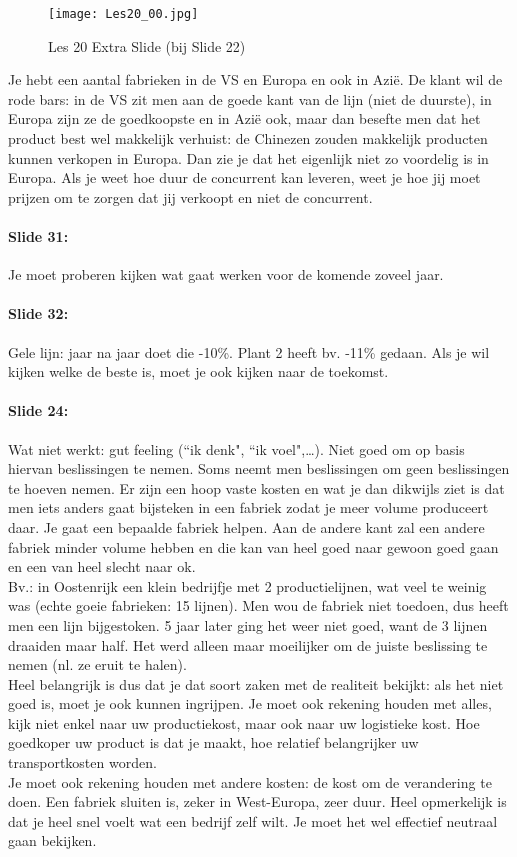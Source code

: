 \documentclass[10pt,a4paper]{report}
\begin{document}
\begin{figure}[h!]
\centering
\texttt{[image: Les20\_00.jpg]}
\caption{Les 20 Extra Slide (bij Slide 22)} 
\label{les20_00}
\end{figure}

Je hebt een aantal fabrieken in de VS en Europa en ook in Azi\"e. De klant wil de rode bars: in de VS zit men aan de goede kant van de lijn (niet de duurste), in Europa zijn ze de goedkoopste en in Azi\"e ook, maar dan besefte men dat het product best wel makkelijk verhuist: de Chinezen zouden makkelijk producten kunnen verkopen in Europa. Dan zie je dat het eigenlijk niet zo voordelig is in Europa. Als je weet hoe duur de concurrent kan leveren, weet je hoe jij moet prijzen om te zorgen dat jij verkoopt en niet de concurrent.

\paragraph{Slide 31:} Je moet proberen kijken wat gaat werken voor de komende zoveel jaar. 

\paragraph{Slide 32:} Gele lijn: jaar na jaar doet die -10\%. Plant 2 heeft bv. -11\% gedaan. Als je wil kijken welke de beste is, moet je ook kijken naar de toekomst.

\paragraph{Slide 24:} Wat niet werkt: gut feeling (``ik denk", ``ik voel",…). Niet goed om op basis hiervan beslissingen te nemen. Soms neemt men beslissingen om geen beslissingen te hoeven nemen. Er zijn een hoop vaste kosten en wat je dan dikwijls ziet is dat men iets anders gaat bijsteken in een fabriek zodat je meer volume produceert daar. Je gaat een bepaalde fabriek helpen. Aan de andere kant zal een andere fabriek minder volume hebben en die kan van heel goed naar gewoon goed gaan en een van heel slecht naar ok. \\
Bv.: in Oostenrijk een klein bedrijfje met 2 productielijnen, wat veel te weinig was (echte goeie fabrieken: 15 lijnen). Men wou de fabriek niet toedoen, dus heeft men een lijn bijgestoken. 5 jaar later ging het weer niet goed, want de 3 lijnen draaiden maar half. Het werd alleen maar moeilijker om de juiste beslissing te nemen (nl. ze eruit te halen). \\
Heel belangrijk is dus dat je dat soort zaken met de realiteit bekijkt: als het niet goed is, moet je ook kunnen ingrijpen. Je moet ook rekening houden met alles, kijk niet enkel naar uw productiekost, maar ook naar uw logistieke kost. Hoe goedkoper uw product is dat je maakt, hoe relatief belangrijker uw transportkosten worden.\\
Je moet ook rekening houden met andere kosten: de kost om de verandering te doen. Een fabriek sluiten is, zeker in West-Europa, zeer duur. Heel opmerkelijk is dat je heel snel voelt wat een bedrijf zelf wilt. Je moet het wel effectief neutraal gaan bekijken.
\end{document}
